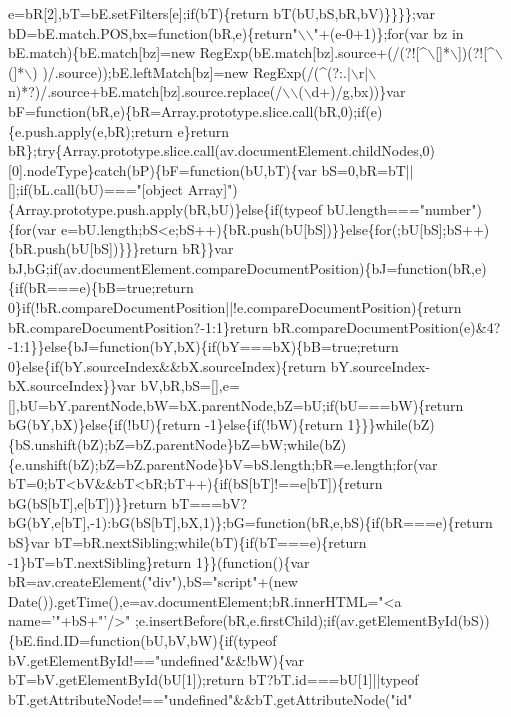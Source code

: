 \begin{DoxyCode}
{       e=bR[2],bT=bE.setFilters[e];if(bT)\{return bT(bU,bS,bR,bV)\}\}\}\};var bD=bE.match.POS,bx=function(bR,e)\{return"}\(\backslash\)\(\backslash\)\textcolor{stringliteral}{"+(e-0+1)\};for(var bz
       in bE.match)\{bE.match[bz]=new RegExp(bE.match[bz].source+(/(?![^\(\backslash\)[]*\(\backslash\)])(?![^\(\backslash\)(]*\(\backslash\))
      )/.source));bE.leftMatch[bz]=new RegExp(/(^(?:.|\(\backslash\)r|\(\backslash\)n)*?)/.source+bE.match[bz].source.replace(/\(\backslash\)\(\backslash\)(\(\backslash\)d+)/g,bx))\}var
       bF=function(bR,e)\{bR=Array.prototype.slice.call(bR,0);if(e)\{e.push.apply(e,bR);return e\}return
       bR\};try\{Array.prototype.slice.call(av.documentElement.childNodes,0)[0].nodeType\}catch(bP)\{bF=function(bU,bT)\{var
       bS=0,bR=bT||[];if(bL.call(bU)==="}[\textcolor{keywordtype}{object} Array]\textcolor{stringliteral}{")\{Array.prototype.push.apply(bR,bU)\}else\{if(typeof bU.length==="}number\textcolor{stringliteral}{")\{for(var
       e=bU.length;bS<e;bS++)\{bR.push(bU[bS])\}\}else\{for(;bU[bS];bS++)\{bR.push(bU[bS])\}\}\}return bR\}\}var
       bJ,bG;if(av.documentElement.compareDocumentPosition)\{bJ=function(bR,e)\{if(bR===e)\{bB=true;return
       0\}if(!bR.compareDocumentPosition||!e.compareDocumentPosition)\{return bR.compareDocumentPosition?-1:1\}return
       bR.compareDocumentPosition(e)&4?-1:1\}\}else\{bJ=function(bY,bX)\{if(bY===bX)\{bB=true;return 0\}else\{if(bY.sourceIndex&&bX.sourceIndex)\{return
       bY.sourceIndex-bX.sourceIndex\}\}var
       bV,bR,bS=[],e=[],bU=bY.parentNode,bW=bX.parentNode,bZ=bU;if(bU===bW)\{return bG(bY,bX)\}else\{if(!bU)\{return -1\}else\{if(!bW)\{return
       1\}\}\}while(bZ)\{bS.unshift(bZ);bZ=bZ.parentNode\}bZ=bW;while(bZ)\{e.unshift(bZ);bZ=bZ.parentNode\}bV=bS.length;bR=e.length;for(var
       bT=0;bT<bV&&bT<bR;bT++)\{if(bS[bT]!==e[bT])\{return bG(bS[bT],e[bT])\}\}return
       bT===bV?bG(bY,e[bT],-1):bG(bS[bT],bX,1)\};bG=function(bR,e,bS)\{if(bR===e)\{return bS\}var bT=bR.nextSibling;while(bT)\{if(bT===e)\{return -1\}bT=bT.nextSibling\}return
       1\}\}(function()\{var bR=av.createElement("}div\textcolor{stringliteral}{"),bS="}script\textcolor{stringliteral}{"+(new Date()).getTime(),e=av.documentElement;bR.innerHTML="}<a 
      name=\textcolor{stringliteral}{'"+bS+"'}/>\textcolor{stringliteral}{"
      ;e.insertBefore(bR,e.firstChild);if(av.getElementById(bS))\{bE.find.ID=function(bU,bV,bW)\{if(typeof bV.getElementById!=="}undefined\textcolor{stringliteral}{"&&!bW)\{var bT=bV.getElementById(bU[1]);return
       bT?bT.id===bU[1]||typeof bT.getAttributeNode!=="}undefined\textcolor{stringliteral}{"&&bT.getAttributeNode("}\textcolor{keywordtype}{id}\textcolor{stringliteral}{"
}
\end{DoxyCode}
